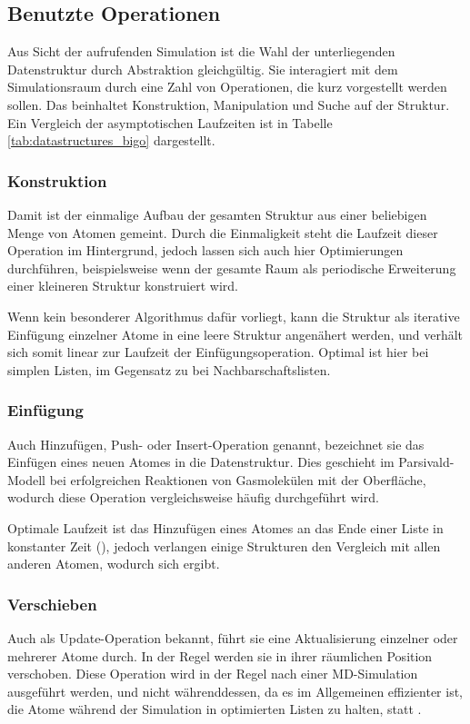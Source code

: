 \subsection{Benutzte Operationen}


Aus Sicht der aufrufenden Simulation ist die Wahl der unterliegenden Datenstruktur durch Abstraktion gleichgültig.
Sie interagiert mit dem Simulationsraum durch eine Zahl von Operationen, die kurz vorgestellt werden sollen.
Das beinhaltet Konstruktion, Manipulation und Suche auf der Struktur.
Ein Vergleich der asymptotischen Laufzeiten ist in Tabelle \ref{tab:datastructures_bigo} dargestellt.

\subsubsection{Konstruktion}
Damit ist der einmalige Aufbau der gesamten Struktur aus einer beliebigen Menge von Atomen gemeint.
Durch die Einmaligkeit steht die Laufzeit dieser Operation im Hintergrund, jedoch lassen sich auch hier Optimierungen durchführen, beispielsweise wenn der gesamte Raum als periodische Erweiterung einer kleineren Struktur konstruiert wird.

Wenn kein besonderer Algorithmus dafür vorliegt, kann die Struktur als iterative Einfügung einzelner Atome in eine leere Struktur angenähert werden, und verhält sich somit linear zur Laufzeit der Einfügungsoperation.
Optimal ist hier  bei simplen Listen, im Gegensatz zu  bei Nachbarschaftslisten.

\subsubsection{Einfügung}
Auch Hinzufügen, Push- oder Insert-Operation genannt, bezeichnet sie das Einfügen eines neuen Atomes in die Datenstruktur.
Dies geschieht im Parsivald-Modell bei erfolgreichen Reaktionen von Gasmolekülen mit der Oberfläche, wodurch diese Operation vergleichsweise häufig durchgeführt wird.

Optimale Laufzeit ist das Hinzufügen eines Atomes an das Ende einer Liste in konstanter Zeit (), jedoch verlangen einige Strukturen den Vergleich mit allen anderen Atomen, wodurch sich  ergibt.

\subsubsection{Verschieben}
Auch als Update-Operation bekannt, führt sie eine Aktualisierung einzelner oder mehrerer Atome durch.
In der Regel werden sie in ihrer räumlichen Position verschoben.
Diese Operation wird in der Regel nach einer MD-Simulation ausgeführt werden, und nicht währenddessen, da es im Allgemeinen effizienter ist, die Atome während der Simulation in optimierten Listen zu halten, statt .

